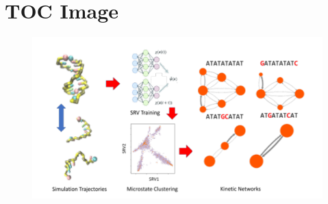 \documentclass[journal=jpcbfk,manuscript=article]{achemso}
\begin{document}
\clearpage
\newpage

\section*{TOC Image}

\begin{figure}[ht!]
	\begin{center} 
        \includegraphics[width=150mm, scale=1]{TOC.pdf}
        \label{fig:TOC}
	\end{center}
\end{figure}
\end{document}
